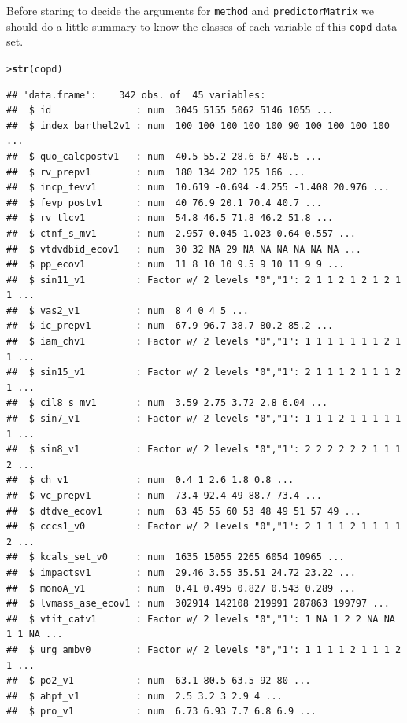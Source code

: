\documentclass[10pt,a4paper,twoside]{article}\usepackage[]{graphicx}\usepackage[]{xcolor}
\makeatletter
\newcommand{\hldef}[1]{\textcolor[rgb]{0.345,0.345,0.345}{#1}}%
\newcommand{\hlkwd}[1]{\textcolor[rgb]{0.737,0.353,0.396}{\textbf{#1}}}%
\newenvironment{kframe}{%
 \def\at@end@of@kframe{}%
 \ifinner\ifhmode%
  \def\at@end@of@kframe{\end{minipage}}%
  \begin{minipage}{\columnwidth}%
 \fi\fi%
 \def\FrameCommand##1{\hskip\@totalleftmargin \hskip-\fboxsep
 \colorbox{shadecolor}{##1}\hskip-\fboxsep
     \hskip-\linewidth \hskip-\@totalleftmargin \hskip\columnwidth}%
 \MakeFramed {\advance\hsize-\width
   \@totalleftmargin\z@ \linewidth\hsize
   \@setminipage}}%
 {\par\unskip\endMakeFramed%
 \at@end@of@kframe}
\newenvironment{knitrout}{}{} %
\makeatother
\begin{document}
Before staring to decide the arguments for \texttt{method} and \texttt{predictorMatrix} we should do a little summary to know the classes of each variable of this \texttt{copd} data-set. 
\begin{knitrout}\footnotesize
{}\color{fgcolor}\begin{kframe}
\begin{alltt}
\hldef{> }\hlkwd{str}\hldef{(copd)}
\end{alltt}
\begin{verbatim}
## 'data.frame':	342 obs. of  45 variables:
##  $ id               : num  3045 5155 5062 5146 1055 ...
##  $ index_barthel2v1 : num  100 100 100 100 100 90 100 100 100 100 ...
##  $ quo_calcpostv1   : num  40.5 55.2 28.6 67 40.5 ...
##  $ rv_prepv1        : num  180 134 202 125 166 ...
##  $ incp_fevv1       : num  10.619 -0.694 -4.255 -1.408 20.976 ...
##  $ fevp_postv1      : num  40 76.9 20.1 70.4 40.7 ...
##  $ rv_tlcv1         : num  54.8 46.5 71.8 46.2 51.8 ...
##  $ ctnf_s_mv1       : num  2.957 0.045 1.023 0.64 0.557 ...
##  $ vtdvdbid_ecov1   : num  30 32 NA 29 NA NA NA NA NA NA ...
##  $ pp_ecov1         : num  11 8 10 10 9.5 9 10 11 9 9 ...
##  $ sin11_v1         : Factor w/ 2 levels "0","1": 2 1 1 2 1 2 1 2 1 1 ...
##  $ vas2_v1          : num  8 4 0 4 5 ...
##  $ ic_prepv1        : num  67.9 96.7 38.7 80.2 85.2 ...
##  $ iam_chv1         : Factor w/ 2 levels "0","1": 1 1 1 1 1 1 1 2 1 1 ...
##  $ sin15_v1         : Factor w/ 2 levels "0","1": 2 1 1 1 2 1 1 1 2 1 ...
##  $ cil8_s_mv1       : num  3.59 2.75 3.72 2.8 6.04 ...
##  $ sin7_v1          : Factor w/ 2 levels "0","1": 1 1 1 2 1 1 1 1 1 1 ...
##  $ sin8_v1          : Factor w/ 2 levels "0","1": 2 2 2 2 2 2 1 1 1 2 ...
##  $ ch_v1            : num  0.4 1 2.6 1.8 0.8 ...
##  $ vc_prepv1        : num  73.4 92.4 49 88.7 73.4 ...
##  $ dtdve_ecov1      : num  63 45 55 60 53 48 49 51 57 49 ...
##  $ cccs1_v0         : Factor w/ 2 levels "0","1": 2 1 1 1 2 1 1 1 1 2 ...
##  $ kcals_set_v0     : num  1635 15055 2265 6054 10965 ...
##  $ impactsv1        : num  29.46 3.55 35.51 24.72 23.22 ...
##  $ monoA_v1         : num  0.41 0.495 0.827 0.543 0.289 ...
##  $ lvmass_ase_ecov1 : num  302914 142108 219991 287863 199797 ...
##  $ vtit_catv1       : Factor w/ 2 levels "0","1": 1 NA 1 2 2 NA NA 1 1 NA ...
##  $ urg_ambv0        : Factor w/ 2 levels "0","1": 1 1 1 1 2 1 1 1 2 1 ...
##  $ po2_v1           : num  63.1 80.5 63.5 92 80 ...
##  $ ahpf_v1          : num  2.5 3.2 3 2.9 4 ...
##  $ pro_v1           : num  6.73 6.93 7.7 6.8 6.9 ...

\end{verbatim}
\end{kframe}
\end{knitrout}
\end{document}
